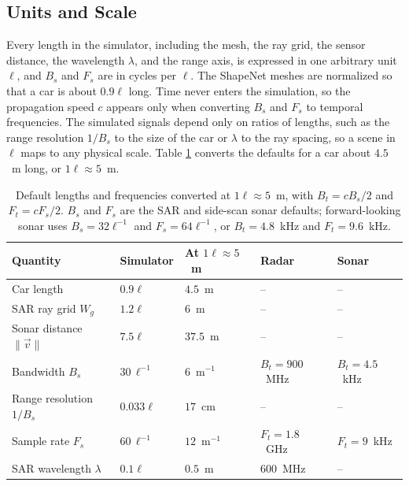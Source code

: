 \documentclass[sensors,article,submit,moreauthors]{Definitions/mdpi}
\begin{document}
\subsection{Units and Scale}
\label{sec:units}

Every length in the simulator, including the mesh, the ray grid, the sensor
distance, the
wavelength $\lambda$, and the range axis, is expressed in one arbitrary unit
$\ell$, and $B_s$ and
$F_s$ are in cycles per $\ell$. The ShapeNet meshes are normalized so that a car
is about
$0.9\ell$ long. Time never enters the simulation, so the propagation speed $c$
appears only when
converting $B_s$ and $F_s$ to temporal frequencies. The simulated signals depend
only on ratios of
lengths, such as the range resolution $1/B_s$ to the size of the car or
$\lambda$ to the ray
spacing, so a scene in $\ell$ maps to any physical scale. Table \ref{tab:units}
converts the
defaults for a car about $4.5$~m long, or $1\ell \approx 5$~m.
\begin{table}[H]
\centering
\caption{Default lengths and frequencies converted at $1\ell \approx 5$~m, with
$B_t = cB_s/2$ and $F_t = cF_s/2$. $B_s$ and $F_s$ are the SAR and side-scan
sonar defaults;
forward-looking sonar uses $B_s = 32\ell^{-1}$ and $F_s = 64\ell^{-1}$, or $B_t
= 4.8$~kHz and
$F_t = 9.6$~kHz.}
\label{tab:units}
\begin{tabular}{lllll}
\toprule
\textbf{Quantity} & \textbf{Simulator} & \textbf{At $1\ell \approx 5$~m} &
\textbf{Radar} & \textbf{Sonar} \\
\midrule
Car length               & $0.9\ell$          & $4.5$~m        & -- & -- \\
SAR ray grid $W_g$       & $1.2\ell$          & $6$~m          & -- & -- \\
Sonar distance $\lVert\vec{v}\rVert$ & $7.5\ell$ & $37.5$~m    & -- & -- \\
Bandwidth $B_s$          & $30\,\ell^{-1}$    & $6$~m$^{-1}$   & $B_t = 900$~MHz
& $B_t = 4.5$~kHz \\
Range resolution $1/B_s$ & $0.033\ell$        & $17$~cm        & -- & -- \\
Sample rate $F_s$        & $60\,\ell^{-1}$    & $12$~m$^{-1}$  & $F_t = 1.8$~GHz
& $F_t = 9$~kHz \\
SAR wavelength $\lambda$ & $0.1\ell$          & $0.5$~m        & $600$~MHz & --
\\
\bottomrule
\end{tabular}
\end{table}
\end{document}
